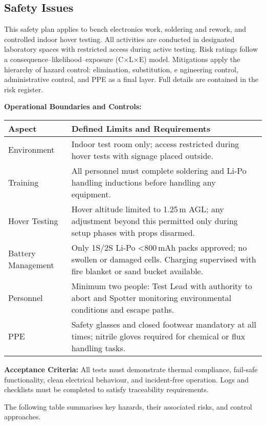 
\subsection{Safety Issues}
This safety plan applies to bench electronics work, soldering and rework, and controlled indoor hover testing. All activities are conducted in designated laboratory spaces with restricted access during active testing. Risk ratings follow a consequence–likelihood–exposure (C×L×E) model. Mitigations apply the hierarchy of hazard control: elimination, substitution, e
ngineering control, administrative control, and PPE as a final layer. Full details are contained in the risk register.

\vspace{0.5em}
\textbf{Operational Boundaries and Controls:}

\begin{tabular}{|p{4cm}|p{11.5cm}|}
\hline
\rowcolor{gray!15}\textbf{Aspect} & \textbf{Defined Limits and Requirements} \\ \hline
Environment & Indoor test room only; access restricted during hover tests with signage placed outside. \\ \hline
Training & All personnel must complete soldering and Li-Po handling inductions before handling any equipment. \\ \hline
Hover Testing & Hover altitude limited to 1.25\,m AGL; any adjustment beyond this permitted only during setup phases with props disarmed. \\ \hline
Battery Management & Only 1S/2S Li-Po <800\,mAh packs approved; no swollen or damaged cells. Charging supervised with fire blanket or sand bucket available. \\ \hline
Personnel & Minimum two people: Test Lead with authority to abort and Spotter monitoring environmental conditions and escape paths. \\ \hline
PPE & Safety glasses and closed footwear mandatory at all times; nitrile gloves required for chemical or flux handling tasks. \\ \hline
\end{tabular}

\vspace{0.5em}
\textbf{Acceptance Criteria:} All tests must demonstrate thermal compliance, fail-safe functionality, clean electrical behaviour, and incident-free operation. Logs and checklists must be completed to satisfy traceability requirements.

The following table summarises key hazards, their associated risks, and control approaches.

